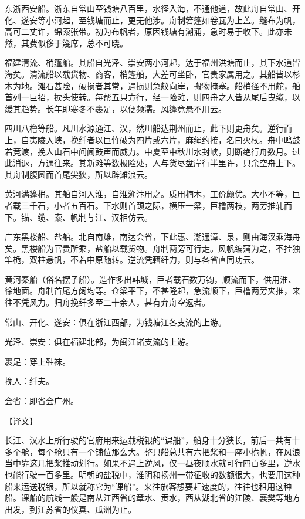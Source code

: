 \documentclass[12pt,UTF8]{ctexbook}
\begin{document}
东浙西安船。浙东自常山至钱塘八百里，水径入海，不通他道，故此舟自常山、开化、遂安等小河起，至钱塘而止，更无他涉。舟制箬篷如卷瓦为上盖。缝布为帆，高可二丈许，绵索张带。初为布帆者，原因钱塘有潮涌，急时易于收下。此亦未然，其费似侈于篾席，总不可晓。

福建清流、梢篷船。其船自光泽、崇安两小河起，达于福州洪塘而止，其下水道皆海矣。清流船以载货物、商客，梢篷船，大差可坐卧，官贵家属用之。其船皆以杉木为地。滩石甚险，破损者其常，遇损则急舣向岸，搬物掩塞。船梢径不用舵，船首列一巨招，捩头使转。每帮五只方行，经一险滩，则四舟之人皆从尾后曳缆，以缓其趋势。长年即寒冬不裹足，以便频濡。风篷竟悬不用云。

四川八橹等船。凡川水源通江、汉，然川船达荆州而止，此下则更舟矣。逆行而上，自夷陵入峡，挽纤者以巨竹破为四片或六片，麻绳约接，名曰火杖。舟中鸣鼓若竞渡，挽人山石中间闻鼓声而威力。中夏至中秋川水封峡，则断绝行舟数月。过此消退，方通往来。其新滩等数极险处，人与货尽盘岸行半里许，只余空舟上下。其舟制腹圆而首尾尖狭，所以辟滩浪云。

黄河满篷梢。其船自河入淮，自淮溯汴用之。质用楠木，工价颇优。大小不等，巨者载三千石，小者五百石。下水则首颈之际，横压一梁，巨橹两枝，两旁推轧而下。锚、缆、索、帆制与江、汉相仿云。

广东黑楼船、盐船。北自南雄，南达会省，下此惠、潮通漳、泉，则由海汊乘海舟矣。黑楼船为官贵所乘，盐船以载货物。舟制两旁可行走。风帆编蒲为之，不挂独竿桅，双柱悬帆，不若中原随转。逆流凭藉纤力，则与各省直同功云。

黄河秦船（俗名摆子船）。造作多出韩城，巨者载石数万钧，顺流而下，供用淮、徐地面。舟制首尾方阔均等。仓梁平下，不甚隆起，急流顺下，巨橹两旁夹推，来往不凭风力。归舟挽纤多至二十余人，甚有弃舟空返者。

常山、开化、遂安：俱在浙江西部，为钱塘江各支流的上游。

光泽、崇安：俱在福建北部，为闽江诸支流的上游。

裹足：穿上鞋袜。

挽人：纤夫。

会省：即省会广州。

【译文】

长江、汉水上所行驶的官府用来运载税银的“课船”，船身十分狭长，前后一共有十多个舱，每个舱只有一个铺位那么大。整只船总共有六把桨和一座小桅帆，在风浪当中靠这几把桨推动划行。如果不遇上逆风，仅一昼夜顺水就可行四百多里，逆水也能行驶一百多里。明朝的盐税中，淮阴和扬州一带征收的数额很大，也要用这种船来运送税银，所以就称它为“课船”。来往旅客想要赶速度的，往往也租用这种船。课船的航线一般是南从江西省的章水、贡水，西从湖北省的江陵、襄樊等地方出发，到江苏省的仪真、瓜洲为止。
\end{document}
